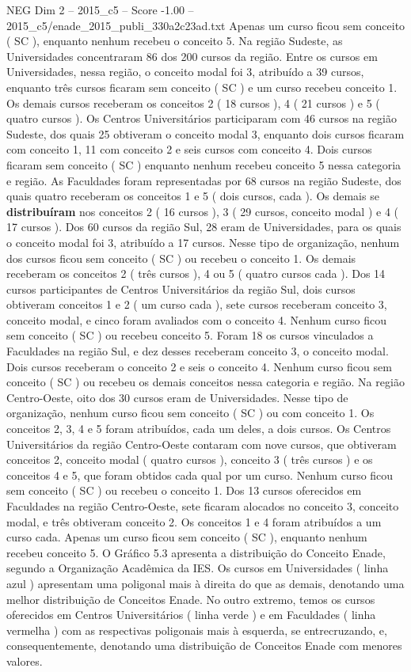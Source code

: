 \begin{textsample}{NEG Dim 2 – 2015\_c5 – Score -1.00 – 2015\_c5/enade\_2015\_publi\_330a2c23ad.txt}
Apenas um curso ficou sem conceito ( SC ), enquanto nenhum recebeu o conceito 5.
Na região Sudeste, as Universidades concentraram 86 dos 200 cursos da região.
Entre os cursos em Universidades, nessa região, o conceito modal foi 3, atribuído a 39 cursos, enquanto três cursos ficaram sem conceito ( SC ) e um curso recebeu conceito 1.
Os demais cursos receberam os conceitos 2 ( 18 cursos ), 4 ( 21 cursos ) e 5 ( quatro cursos ).
Os Centros Universitários participaram com 46 cursos na região Sudeste, dos quais 25 obtiveram o conceito modal 3, enquanto dois cursos ficaram com conceito 1, 11 com conceito 2 e seis cursos com conceito 4.
Dois cursos ficaram sem conceito ( SC ) enquanto nenhum recebeu conceito 5 nessa categoria e região.
As Faculdades foram representadas por 68 cursos na região Sudeste, dos quais quatro receberam os conceitos 1 e 5 ( dois cursos, cada ).
Os demais se \textbf{distribuíram} nos conceitos 2 ( 16 cursos ), 3 ( 29 cursos, conceito modal ) e 4 ( 17 cursos ).
Dos 60 cursos da região Sul, 28 eram de Universidades, para os quais o conceito modal foi 3, atribuído a 17 cursos.
Nesse tipo de organização, nenhum dos cursos ficou sem conceito ( SC ) ou recebeu o conceito 1.
Os demais receberam os conceitos 2 ( três cursos ), 4 ou 5 ( quatro cursos cada ).
Dos 14 cursos participantes de Centros Universitários da região Sul, dois cursos obtiveram conceitos 1 e 2 ( um curso cada ), sete cursos receberam conceito 3, conceito modal, e cinco foram avaliados com o conceito 4.
Nenhum curso ficou sem conceito ( SC ) ou recebeu conceito 5.
Foram 18 os cursos vinculados a Faculdades na região Sul, e dez desses receberam conceito 3, o conceito modal.
Dois cursos receberam o conceito 2 e seis o conceito 4.
Nenhum curso ficou sem conceito ( SC ) ou recebeu os demais conceitos nessa categoria e região.
Na região Centro-Oeste, oito dos 30 cursos eram de Universidades.
Nesse tipo de organização, nenhum curso ficou sem conceito ( SC ) ou com conceito 1.
Os conceitos 2, 3, 4 e 5 foram atribuídos, cada um deles, a dois cursos.
Os Centros Universitários da região Centro-Oeste contaram com nove cursos, que obtiveram conceitos 2, conceito modal ( quatro cursos ), conceito 3 ( três cursos ) e os conceitos 4 e 5, que foram obtidos cada qual por um curso.
Nenhum curso ficou sem conceito ( SC ) ou recebeu o conceito 1.
Dos 13 cursos oferecidos em Faculdades na região Centro-Oeste, sete ficaram alocados no conceito 3, conceito modal, e três obtiveram conceito 2.
Os conceitos 1 e 4 foram atribuídos a um curso cada.
Apenas um curso ficou sem conceito ( SC ), enquanto nenhum recebeu conceito 5.
O Gráfico 5.3 apresenta a distribuição do Conceito Enade, segundo a Organização Acadêmica da IES.
Os cursos em Universidades ( linha azul ) apresentam uma poligonal mais à direita do que as demais, denotando uma melhor distribuição de Conceitos Enade.
No outro extremo, temos os cursos oferecidos em Centros Universitários ( linha verde ) e em Faculdades ( linha vermelha ) com as respectivas poligonais mais à esquerda, se entrecruzando, e, consequentemente, denotando uma distribuição de Conceitos Enade com menores valores.

\end{textsample}
